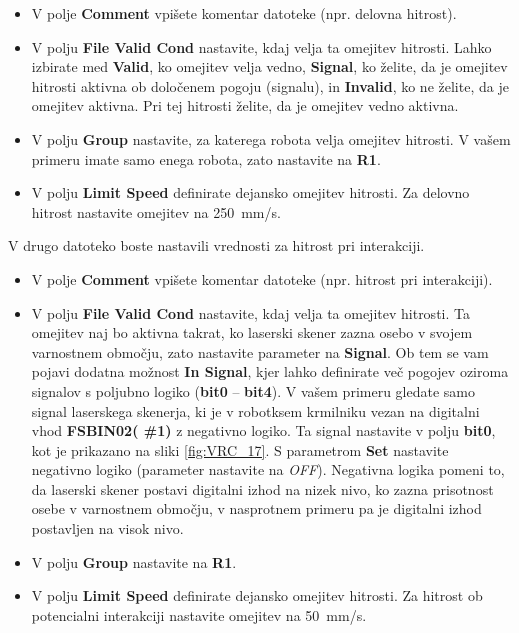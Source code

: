 \begin{itemize}
	\item V polje \textbf{Comment} vpišete komentar datoteke (npr. delovna hitrost).
	\item V polju \textbf{File Valid Cond} nastavite, kdaj velja ta omejitev hitrosti. Lahko izbirate med \textbf{Valid}, ko omejitev velja vedno, \textbf{Signal}, ko želite, da je omejitev hitrosti aktivna ob določenem pogoju (signalu), in {\textbf{Invalid}}, ko ne želite, da je omejitev aktivna. Pri tej hitrosti želite, da je omejitev vedno aktivna.
	\item V polju \textbf{Group} nastavite, za katerega robota velja omejitev hitrosti. V vašem primeru imate samo enega robota, zato nastavite na \textbf{R1}.
	\item V polju \textbf{Limit Speed} definirate dejansko omejitev hitrosti. Za delovno hitrost nastavite omejitev na 250~mm/s.
\end{itemize}

V drugo datoteko boste nastavili vrednosti za hitrost pri interakciji.

\begin{itemize}
	\item V polje \textbf{Comment} vpišete komentar datoteke (npr. hitrost pri interakciji).
	\item V polju \textbf{{File Valid Cond}} nastavite, kdaj velja ta omejitev hitrosti. Ta  omejitev naj bo aktivna takrat, ko laserski skener zazna osebo v svojem varnostnem območju, zato nastavite parameter na \textbf{Signal}. Ob tem se vam pojavi dodatna možnost \textbf{In Signal}, kjer lahko definirate več pogojev oziroma signalov s poljubno logiko (\textbf{bit0} -- \textbf{bit4}). V vašem primeru gledate samo signal laserskega skenerja, ki je v robotksem krmilniku vezan na digitalni vhod  \textbf{FSBIN02( \#1)} z negativno logiko. Ta signal nastavite v polju \textbf{bit0}, kot je prikazano na sliki \ref{fig:VRC_17}. S parametrom \textbf{Set} nastavite negativno logiko (parameter nastavite na \emph{OFF}). Negativna logika pomeni to, da laserski skener postavi digitalni izhod na nizek nivo, ko zazna prisotnost osebe v varnostnem območju, v nasprotnem primeru pa je digitalni izhod postavljen na visok nivo.
	\item V polju \textbf{Group} nastavite na \textbf{R1}.
	\item V polju \textbf{Limit Speed} definirate dejansko omejitev hitrosti. Za hitrost ob potencialni interakciji nastavite omejitev na 50~mm/s.
\end{itemize}

